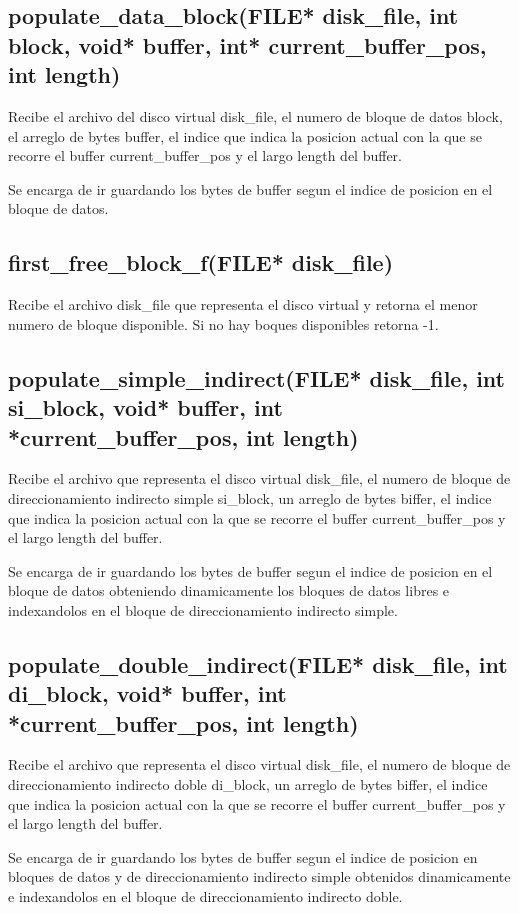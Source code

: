 \documentclass[12pt]{article}
\begin{document}
\subsection{populate\_data\_block(FILE* disk\_file, int block, void* buffer, int* current\_buffer\_pos, int length) }
Recibe el archivo del disco virtual disk\_file, el numero de bloque de datos block, el arreglo de bytes buffer, el indice que indica la posicion actual con la que se recorre el buffer current\_buffer\_pos y el largo length del buffer.

Se encarga de ir guardando los bytes de buffer segun el indice de posicion en el bloque de datos.

\subsection{first\_free\_block\_f(FILE* disk\_file)}
Recibe el archivo disk\_file que representa el disco virtual y retorna el menor numero de bloque disponible. Si no hay boques disponibles retorna -1.

\subsection{populate\_simple\_indirect(FILE* disk\_file, int si\_block, void* buffer, int *current\_buffer\_pos, int length)}
Recibe el archivo que representa el disco virtual disk\_file, el numero de bloque de direccionamiento indirecto simple si\_block, un arreglo de bytes biffer, el indice que indica la posicion actual con la que se recorre el buffer current\_buffer\_pos y el largo length del buffer.

Se encarga de ir guardando los bytes de buffer segun el indice de posicion en el bloque de datos obteniendo dinamicamente los bloques de datos libres e indexandolos en el bloque de direccionamiento indirecto simple.


\subsection{populate\_double\_indirect(FILE* disk\_file, int di\_block, void* buffer, int *current\_buffer\_pos, int length)}
Recibe el archivo que representa el disco virtual disk\_file, el numero de bloque de direccionamiento indirecto doble di\_block, un arreglo de bytes biffer, el indice que indica la posicion actual con la que se recorre el buffer current\_buffer\_pos y el largo length del buffer.

Se encarga de ir guardando los bytes de buffer segun el indice de posicion en bloques de datos y de direccionamiento indirecto simple obtenidos dinamicamente e indexandolos en el bloque de direccionamiento indirecto doble.
\end{document}
